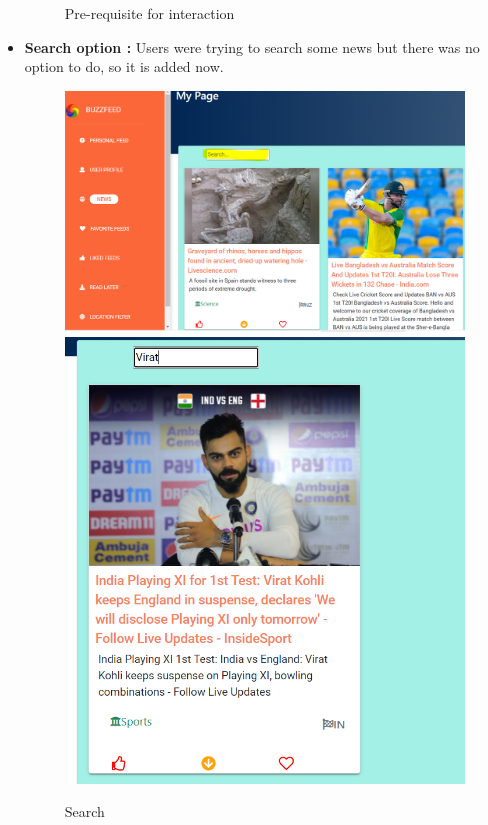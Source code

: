 \begin{itemize}
\begin{figure}[h!]
\centering \caption{Pre-requisite for interaction}
\end{figure}

\item\textbf{Search option : } 
Users were trying to search some news but there was no option to do, so it is added now.
 \begin{figure}[h!]
    \begin{multicols}{2}
    \includegraphics[scale = 0.5]{images/option.PNG}
    \includegraphics[scale = 0.5]{images/search.PNG} 
    \end{multicols}
\centering \caption{Search}
\end{figure}
 \end{itemize}
 

